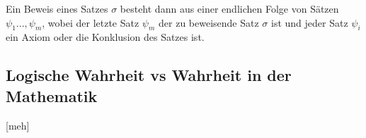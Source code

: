\documentclass[12pt,a4paper]{article} %
\begin{document}
Ein Beweis eines Satzes $\sigma$ besteht dann aus einer endlichen Folge von Sätzen $\psi_1..., \psi_m$, wobei der letzte Satz $\psi_m$ der zu beweisende Satz $\sigma$ ist und jeder Satz $\psi_i$ ein Axiom oder die Konklusion des Satzes ist.

\subsection{Logische Wahrheit vs Wahrheit in der Mathematik}
[meh]
\end{document}
